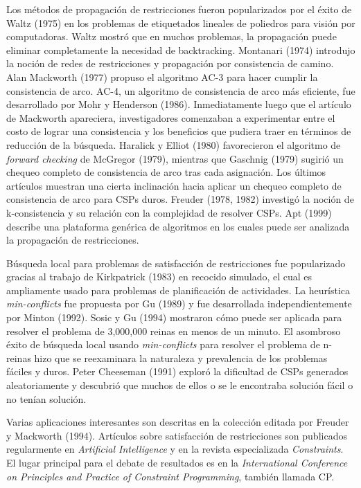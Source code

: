Los m\'etodos de propagaci\'on de restricciones fueron popularizados por el \'exito de Waltz (1975) en los problemas de etiquetados lineales de poliedros para visi\'on por computadoras. Waltz mostr\'o que en muchos problemas, la propagaci\'on puede eliminar completamente la necesidad de backtracking. Montanari (1974) introdujo la noci\'on de redes de restricciones y propagaci\'on por consistencia de camino. Alan Mackworth (1977) propuso el algoritmo AC-3 para hacer cumplir la consistencia de arco. AC-4, un algoritmo de consistencia de arco m\'as eficiente, fue desarrollado por Mohr y Henderson (1986). Inmediatamente luego que el art\'iculo de Mackworth apareciera, investigadores comenzaban a experimentar entre el costo de lograr una consistencia y los beneficios que pudiera traer en t\'erminos de reducci\'on de la b\'usqueda. Haralick y Elliot (1980) favorecieron el algoritmo de \emph{forward checking} de McGregor (1979), mientras que Gaschnig (1979) sugiri\'o un chequeo completo de consistencia de arco tras cada asignaci\'on. Los \'ultimos art\'iculos muestran una cierta inclinaci\'on hacia aplicar un chequeo completo de consistencia de arco para CSPs duros. Freuder (1978, 1982) investig\'o la noci\'on de k-consistencia y su relaci\'on con la complejidad de resolver CSPs. Apt (1999) describe una plataforma gen\'erica de algoritmos en los cuales puede ser analizada la propagaci\'on de restricciones.

B\'usqueda local para problemas de satisfacci\'on de restricciones fue popularizado gracias al trabajo de Kirkpatrick (1983) en recocido simulado, el cual es ampliamente usado para problemas de planificaci\'on de actividades. La heur\'istica \emph{min-conflicts} fue propuesta por Gu (1989) y fue desarrollada independientemente por Minton (1992). Sosic y Gu (1994) mostraron c\'omo puede ser aplicada para resolver el problema de 3,000,000 reinas en menos de un minuto. El asombroso \'exito de b\'usqueda local usando \emph{min-conflicts} para resolver el problema de n-reinas hizo que se reexaminara la naturaleza y prevalencia de los problemas f\'aciles y duros. Peter Cheeseman (1991) explor\'o la dificultad de CSPs generados aleatoriamente y descubri\'o que muchos de ellos o se le encontraba soluci\'on f\'acil o no ten\'ian soluci\'on.

Varias aplicaciones interesantes son descritas en la colecci\'on editada por Freuder y Mackworth (1994). Art\'iculos sobre satisfacci\'on de restricciones son publicados regularmente en \emph{Artificial Intelligence} y en la revista especializada \emph{Constraints}. El lugar principal para el debate de resultados es en la \emph{International Conference on Principles and Practice of Constraint Programming}, tambi\'en llamada CP.